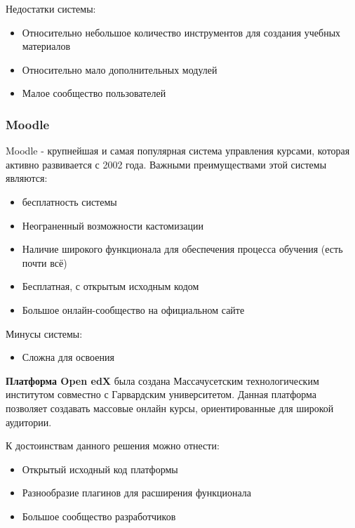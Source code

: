 \documentclass[a4paper,14pt]{article}
\begin{document}
Недостатки системы:

\begin{itemize}
	\item Относительно небольшое количество инструментов для создания учебных материалов
	\item Относительно мало дополнительных модулей
	\item Малое сообщество пользователей
	
	
\end{itemize} 

\subsubsection{Moodle}

Moodle - крупнейшая и самая популярная система управления курсами, которая активно развивается с 2002 года. Важными преимуществами этой системы являются:

\begin{itemize}
	\item бесплатность системы
	\item Неограненный возможности кастомизации
	\item Наличие широкого функционала для обеспечения процесса обучения (есть почти всё)
	\item Бесплатная, с открытым исходным кодом
	\item Большое онлайн-сообщество на официальном сайте
	
\end{itemize} 

Минусы системы:

\begin{itemize}
	\item Сложна для освоения	
\end{itemize} 


\textbf{Платформа Open edX} была создана Массачусетским технологическим институтом совместно с Гарвардским университетом.
Данная платформа позволяет создавать массовые онлайн курсы, ориентированные для широкой аудитории.

К достоинствам данного решения можно отнести:

\begin{itemize}
	\item Открытый исходный код платформы
	\item Разнообразие плагинов для расширения функционала
	\item Большое сообщество разработчиков
\end{itemize}
\end{document}
